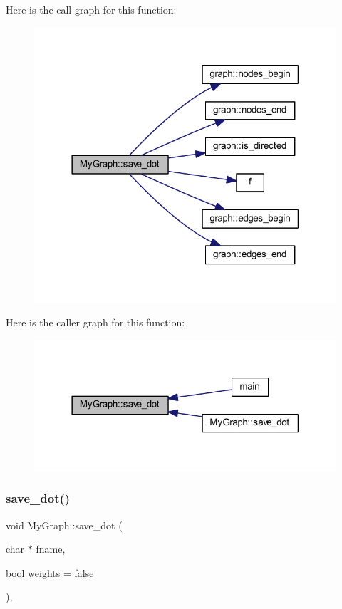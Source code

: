 Here is the call graph for this function\+:
\nopagebreak
\begin{figure}[H]
\begin{center}
\leavevmode
\includegraphics[width=318pt]{class_my_graph_acf68ca166eebb43a80b722c6ef15d22c_cgraph}
\end{center}
\end{figure}
Here is the caller graph for this function\+:
\nopagebreak
\begin{figure}[H]
\begin{center}
\leavevmode
\includegraphics[width=318pt]{class_my_graph_acf68ca166eebb43a80b722c6ef15d22c_icgraph}
\end{center}
\end{figure}
\mbox{\label{class_my_graph_a646cfd85f487b7f7b8fd9f074bd595ca}} 
\subsubsection{\texorpdfstring{save\+\_\+dot()}{save\_dot()}\hspace{0.1cm}{\footnotesize\ttfamily [2/2]}}
{\footnotesize\ttfamily void My\+Graph\+::save\+\_\+dot (\begin{DoxyParamCaption}\item[{char $\ast$}]{fname,  }\item[{bool}]{weights = {\ttfamily false} }\end{DoxyParamCaption})\hspace{0.3cm}{\ttfamily [virtual]}, {\ttfamily [inherited]}}


